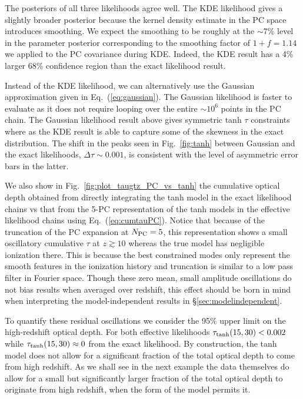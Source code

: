 \documentclass[prd,twocolumn,amsmath,amssymb,floatfix,superscriptaddress,nofootinbib]{revtex4-1}
\begin{document}
The posteriors of all three likelihoods agree well. The KDE likelihood gives a slightly broader posterior because the kernel density estimate in the PC space introduces smoothing. We expect the smoothing to be roughly at the $\sim$7\% level in the parameter posterior corresponding to the smoothing factor of $1+f = 1.14$ we applied to the PC covariance during KDE. Indeed, the KDE result has a 4\% larger 68\% confidence region than the exact likelihood result. 

Instead of the KDE likelihood, we can alternatively use the Gaussian approximation given in Eq.~(\ref{eq:gaussian}). The Gaussian likelihood is faster to evaluate as it does not require looping over the entire $\sim 10^6$ points in the PC chain. 
The Gaussian likelihood result above gives symmetric tanh $\tau$ constraints where as the KDE result is able to capture some of the skewness in the exact distribution. The shift in the peaks seen in Fig.~\ref{fig:tanh} between Gaussian and the exact likelihoods, $\Delta \tau \sim 0.001$, is consistent with the level of asymmetric error bars in the latter. 

We also show in Fig.~\ref{fig:plot_taugtz_PC_vs_tanh} the cumulative optical depth obtained from directly integrating the tanh model in the exact likelihood chains vs that from the 5-PC representation of the tanh models in the effective likelihood chains using Eq.~(\ref{eq:cumtauPC}).
Notice that because of the truncation of the PC expansion at $N_{\rm PC}=5$,
this representation shows a small oscillatory cumulative $\tau$ at $z \gtrsim 10$ whereas the true model has negligible ionization there.   This is because the best constrained modes only represent the smooth features in the ionization history and truncation is similar to a low pass filter in Fourier space.  Though these zero mean, small amplitude oscillations do not bias results when averaged over redshift, this effect should be born in mind when interpreting the model-independent results in \S\ref{sec:modelindependent}.  

To quantify these residual oscillations we consider 
the 95\% upper limit on the high-redshift optical depth.
For both effective likelihoods  $\tau_{\rm tanh}(15, 30) < 0.002$  while $\tau_{\rm tanh}(15,30) \approx 0$
from the exact likelihood. 
By construction, the tanh model does not allow for a significant fraction of the total optical depth to come from high redshift.  As we shall see in the next example the data themselves do allow for a small but significantly larger fraction of the total optical depth to originate from high redshift, when the form of the model permits it.
\end{document}
